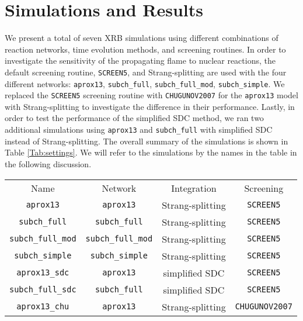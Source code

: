 \documentclass[preprint,times,tighten,linenumbers]{aastex631}
\begin{document}
\section{Simulations and Results}\label{Sec:results}

We present a total of seven XRB simulations using different combinations of reaction networks, time evolution methods, and screening routines. In order to investigate the sensitivity of the propagating flame to nuclear reactions, the default screening routine, {\tt SCREEN5}, and Strang-splitting are used with the four different networks: {\tt aprox13}, {\tt subch\_full}, {\tt subch\_full\_mod}, {\tt subch\_simple}. We replaced the {\tt SCREEN5} screening routine with {\tt CHUGUNOV2007} for the {\tt aprox13} model with Strang-splitting to investigate the difference in their performance. Lastly, in order to test the performance of the simplified SDC method, we ran two additional simulations using {\tt aprox13} and {\tt subch\_full} with simplified SDC instead of Strang-splitting. The overall summary of the simulations is shown in Table \ref{Tab:settings}.  We will
refer to the simulations by the names in the table
in the following discussion.


\begin{table*}
\caption{\label{Tab:settings}
Various settings used for each simulation.
}
\begin{ruledtabular}
\begin{tabular}{cccc}
Name &
Network &
Integration &
Screening
\\ 

\colrule

{\tt aprox13} & {\tt aprox13} & Strang-splitting & {\tt SCREEN5} \\
{\tt subch\_full} & {\tt subch\_full} & Strang-splitting & {\tt SCREEN5} \\
{\tt subch\_full\_mod} & {\tt subch\_full\_mod} & Strang-splitting & {\tt SCREEN5} \\
{\tt subch\_simple} & {\tt subch\_simple} & Strang-splitting & {\tt SCREEN5} \\
{\tt aprox13\_sdc} & {\tt aprox13} & simplified SDC & {\tt SCREEN5} \\
{\tt subch\_full\_sdc} & {\tt subch\_full} & simplified SDC & {\tt SCREEN5} \\
{\tt aprox13\_chu} & {\tt aprox13} & Strang-splitting & {\tt CHUGUNOV2007} 

\end{tabular}
\end{ruledtabular}
\end{table*}
\end{document}
